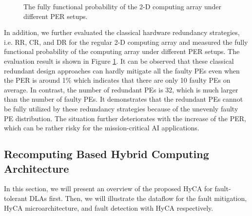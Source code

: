 \begin{figure}
    \setlength{\abovecaptionskip}{-1pt}
    \setlength{\belowcaptionskip}{0pt}
            \caption{The fully functional probability of the 2-D computing array under different PER setups.}
            \label{fig:mo}
            \vspace{-1em}
\end{figure}

In addition, we further evaluated the classical hardware redundancy strategies, i.e. RR, CR, and DR for the regular 2-D computing array and measured the fully functional probability of the computing array under different PER setups. The evaluation result is shown in Figure \ref{fig:mo}. It can be observed that these classical redundant design approaches can hardly mitigate all the faulty PEs even when the PER is around 1\% which indicates that there are only 10 faulty PEs on average. In contrast, the number of redundant PEs is 32, which is much larger than the number of faulty PEs. It demonstrates that the redundant PEs cannot be fully utilized by these redundancy strategies because of the unevenly faulty PE distribution. The situation further deteriorates with the increase of the PER, which can be rather risky for the mission-critical AI applications.


\subsection{Recomputing Based Hybrid Computing Architecture}
In this section, we will present an overview of the proposed HyCA for fault-tolerant DLAs first. Then, we will illustrate the dataflow for the fault mitigation, HyCA microarchitecture, and fault detection with HyCA respectively.

